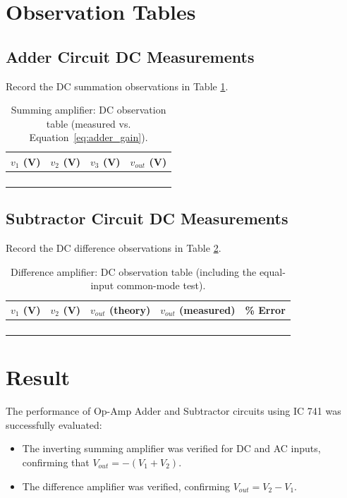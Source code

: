 \section{Observation Tables}

\subsection{Adder Circuit DC Measurements}
Record the DC summation observations in Table \ref{tab:dc_adder}.

\begin{table}[h!]
	\centering
	\begin{tabular}{@{}cccc@{}}
		\toprule
		$v_1$ (V) & $v_2$ (V) & $v_3$ (V) & $v_{out}$ (V) \\
		\midrule
		&  &  &  \\
		&  &  &  \\
		&  &  &  \\
		&  &  &  \\
		\bottomrule
	\end{tabular}
	\caption{Summing amplifier: DC observation table (measured vs. Equation~\eqref{eq:adder_gain}).}
	\label{tab:dc_adder}
\end{table}


\subsection{Subtractor Circuit DC Measurements}
Record the DC difference observations in Table \ref{tab:dc_subtractor}.
\begin{table}[h!]
	\centering
	\begin{tabular}{@{}ccccc@{}}
		\toprule
		$v_1$ (V) & $v_2$ (V) & $v_{out}$ (theory) & $v_{out}$ (measured) & \% Error \\
		\midrule
		&  &  &  &  \\
		&  &  &  &  \\
		&  &  &  &  \\
		&  &  &  &  \\
		\bottomrule
	\end{tabular}
	\caption{Difference amplifier: DC observation table (including the equal-input common-mode test).}
	\label{tab:dc_subtractor}
\end{table}

\section{Result}
The performance of Op-Amp Adder and Subtractor circuits using IC 741 was successfully evaluated:
\begin{itemize}
	\item The inverting summing amplifier was verified for DC and AC inputs, confirming that $V_{out} = -(V_1 + V_2)$.
	\item The difference amplifier was verified, confirming $V_{out} = V_2 - V_1$.
\end{itemize}

